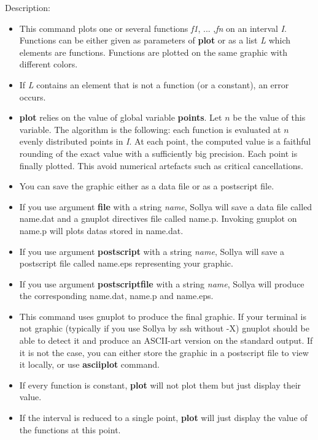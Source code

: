 \noindent Description: \begin{itemize}

\item This command plots one or several functions \emph{f1}, ... ,\emph{fn} on an interval \emph{I}.
   Functions can be either given as parameters of \textbf{plot} or as a list \emph{L}
   which elements are functions.
   Functions are plotted on the same graphic with different colors.

\item If \emph{L} contains an element that is not a function (or a constant), an error
   occurs.

\item \textbf{plot} relies on the value of global variable \textbf{points}. Let $n$ be the 
   value of this variable. The algorithm is the following: each function is 
   evaluated at $n$ evenly distributed points in \emph{I}. At each point, the 
   computed value is a faithful rounding of the exact value with a sufficiently
   big precision. Each point is finally plotted.
   This avoid numerical artefacts such as critical cancellations.

\item You can save the graphic either as a data file or as a postscript file.

\item If you use argument \textbf{file} with a string \emph{name}, Sollya will save a data file
   called name.dat and a gnuplot directives file called name.p. Invoking gnuplot
   on name.p will plots datas stored in name.dat.

\item If you use argument \textbf{postscript} with a string \emph{name}, Sollya will save a 
   postscript file called name.eps representing your graphic.

\item If you use argument \textbf{postscriptfile} with a string \emph{name}, Sollya will 
   produce the corresponding name.dat, name.p and name.eps.

\item This command uses gnuplot to produce the final graphic.
   If your terminal is not graphic (typically if you use Sollya by 
   ssh without -X)
   gnuplot should be able to detect it and produce an ASCII-art version on the
   standard output. If it is not the case, you can either store the graphic in a
   postscript file to view it locally, or use \textbf{asciiplot} command.

\item If every function is constant, \textbf{plot} will not plot them but just display
   their value.

\item If the interval is reduced to a single point, \textbf{plot} will just display the
   value of the functions at this point.
\end{itemize}
